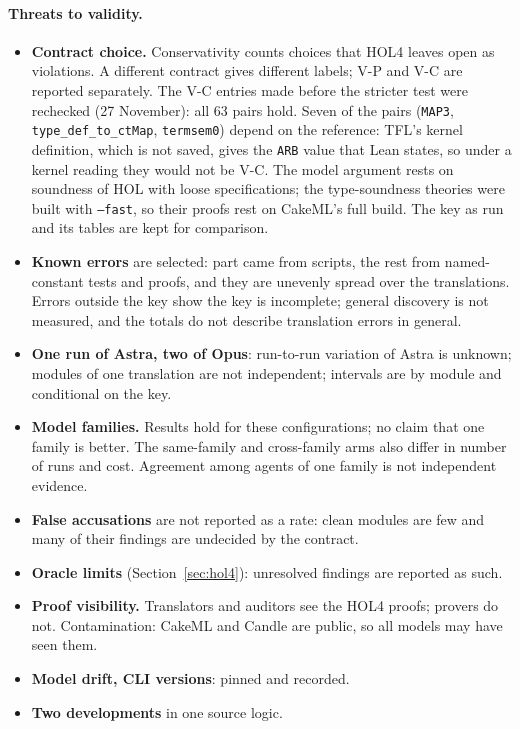 \documentclass[11pt,a4paper]{article}
\newcommand{\code}[1]{\texttt{#1}}
\begin{document}
\paragraph{Threats to validity.}
\begin{itemize}
\item \textbf{Contract choice.} Conservativity counts choices that HOL4 leaves open as violations. A different contract gives different labels; V-P and V-C are reported separately. The V-C entries made before the stricter test were rechecked (27 November): all 63 pairs hold. Seven of the pairs (\code{MAP3}, \code{type\_def\_to\_ctMap}, \code{termsem0}) depend on the reference: TFL's kernel definition, which is not saved, gives the \code{ARB} value that Lean states, so under a kernel reading they would not be V-C. The model argument rests on soundness of HOL with loose specifications; the type-soundness theories were built with \code{--fast}, so their proofs rest on CakeML's full build. The key as run and its tables are kept for comparison.
\item \textbf{Known errors} are selected: part came from scripts, the rest from named-constant tests and proofs, and they are unevenly spread over the translations. Errors outside the key show the key is incomplete; general discovery is not measured, and the totals do not describe translation errors in general.
\item \textbf{One run of Astra, two of Opus}: run-to-run variation of Astra is unknown; modules of one translation are not independent; intervals are by module and conditional on the key.
\item \textbf{Model families.} Results hold for these configurations; no claim that one family is better. The same-family and cross-family arms also differ in number of runs and cost. Agreement among agents of one family is not independent evidence.
\item \textbf{False accusations} are not reported as a rate: clean modules are few and many of their findings are undecided by the contract.
\item \textbf{Oracle limits} (Section~\ref{sec:hol4}): unresolved findings are reported as such.
\item \textbf{Proof visibility.} Translators and auditors see the HOL4 proofs; provers do not. Contamination: CakeML and Candle are public, so all models may have seen them.
\item \textbf{Model drift, CLI versions}: pinned and recorded.
\item \textbf{Two developments} in one source logic.
\end{itemize}
\end{document}
